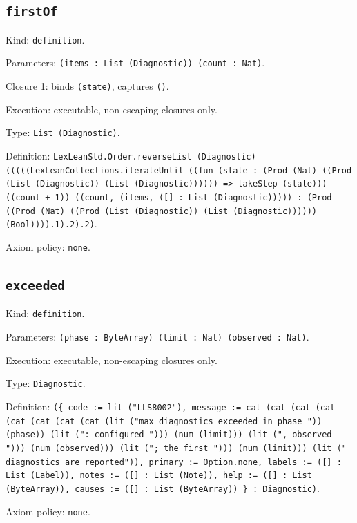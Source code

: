 \documentclass[11pt]{article}
\begin{document}
\subsection*{\texttt{firstOf}}
\noindent Kind: \texttt{definition}.\par
\noindent Parameters: \texttt{(items : List (Diagnostic)) (count : Nat)}.\par
\noindent Closure 1: binds \texttt{(state)}, captures \texttt{()}.\par
\noindent Execution: executable, non-escaping closures only.\par
\noindent Type: \texttt{List (Diagnostic)}.\par
\noindent Definition: \texttt{LexLeanStd.Order.reverseList (Diagnostic) (((((LexLeanCollections.iterateUntil ((fun (state : (Prod (Nat) ((Prod (List (Diagnostic)) (List (Diagnostic)))))) => takeStep (state))) ((count + 1)) ((count, (items, ([] : List (Diagnostic))))) : (Prod ((Prod (Nat) ((Prod (List (Diagnostic)) (List (Diagnostic)))))) (Bool)))).1).2).2)}.\par
\noindent Axiom policy: \texttt{none}.\par
\subsection*{\texttt{exceeded}}
\noindent Kind: \texttt{definition}.\par
\noindent Parameters: \texttt{(phase : ByteArray) (limit : Nat) (observed : Nat)}.\par
\noindent Execution: executable, non-escaping closures only.\par
\noindent Type: \texttt{Diagnostic}.\par
\noindent Definition: \texttt{(\{ code := lit ("LLS8002"), message := cat (cat (cat (cat (cat (cat (cat (cat (lit ("max\_diagnostics exceeded in phase ")) (phase)) (lit (": configured "))) (num (limit))) (lit (", observed "))) (num (observed))) (lit ("; the first "))) (num (limit))) (lit (" diagnostics are reported")), primary := Option.none, labels := ([] : List (Label)), notes := ([] : List (Note)), help := ([] : List (ByteArray)), causes := ([] : List (ByteArray)) \} : Diagnostic)}.\par
\noindent Axiom policy: \texttt{none}.\par
\end{document}
